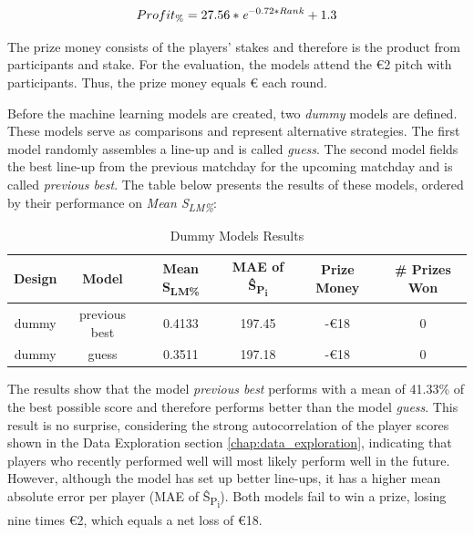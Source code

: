 \begin{equation}
    Profit\textsubscript{\%} = 27.56 * \emph{e}^{-0.72 * Rank} + 1.3 
    \label{eq:rank_to_profit}
\end{equation}

The prize money consists of the players' stakes and therefore is the product from participants and stake. For the evaluation, the models attend the €2 pitch with  participants. Thus, the prize money equals € each round.

Before the machine learning models are created, two \emph{dummy} models are defined. These models serve as comparisons and represent alternative strategies. The first model randomly assembles a line-up and is called \emph{guess}. The second model fields the best line-up from the previous matchday for the upcoming matchday and is called \emph{previous best}. The table below presents the results of these models, ordered by their performance on \emph{Mean S\textsubscript{LM\%}}:

\begin{table}[H]
    \renewcommand{\arraystretch}{1.0}
    \caption{Dummy Models Results}
    \label{tab:results_of_dummy_models}
    \begin{tabular}{@{}cccccc@{}}
    \toprule
    \textbf{Design} & \textbf{Model} & \textbf{Mean S\textsubscript{LM\%}} & \textbf{MAE of \^{S}\textsubscript{P\textsubscript{i}}} & \textbf{Prize Money} & \textbf{\# Prizes Won} \\ \midrule
    dummy   & previous best & 0.4133 & 197.45 & -€18 & 0 \\
    dummy   & guess         & 0.3511 & 197.18 & -€18 & 0 \\ \bottomrule
    \end{tabular}
\end{table}

The results show that the model \emph{previous best} performs with a mean of 41.33\% of the best possible score and therefore performs better than the model \emph{guess}. This result is no surprise, considering the strong autocorrelation of the player scores shown in the Data Exploration section \ref{chap:data_exploration}, indicating that players who recently performed well will most likely perform well in the future. However, although the model has set up better line-ups, it has a higher mean absolute error per player (MAE of \^{S}\textsubscript{P\textsubscript{i}}). Both models fail to win a prize, losing nine times €2, which equals a net loss of €18.

